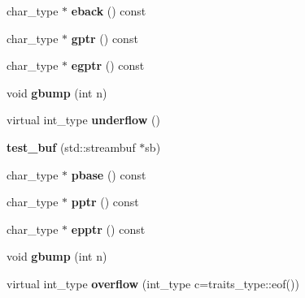 \begin{DoxyCompactItemize}
\mbox{\label{structtest__buf_a28125e70f3e3d4f7e6388feacd5a679a}} 
char\+\_\+type $\ast$ {\bfseries eback} () const
\item 
\mbox{\label{structtest__buf_a647a813e6beea56a0176dbe190a090de}} 
char\+\_\+type $\ast$ {\bfseries gptr} () const
\item 
\mbox{\label{structtest__buf_a885db87a4421d79460cc1007b45acdc4}} 
char\+\_\+type $\ast$ {\bfseries egptr} () const
\item 
\mbox{\label{structtest__buf_a4ef57230c1f973a7581e35cc19548834}} 
void {\bfseries gbump} (int n)
\item 
\mbox{\label{structtest__buf_a07968ce7dbc1007c8fb958e085ecc72f}} 
virtual int\+\_\+type {\bfseries underflow} ()
\item 
\mbox{\label{structtest__buf_ae02e6a8cae14c461432605ce343736d8}} 
{\bfseries test\+\_\+buf} (std\+::streambuf $\ast$sb)
\item 
\mbox{\label{structtest__buf_a363207f713503c9b64d2c43400022557}} 
char\+\_\+type $\ast$ {\bfseries pbase} () const
\item 
\mbox{\label{structtest__buf_a7159b30a129e98ed27b64ce0e00cf88a}} 
char\+\_\+type $\ast$ {\bfseries pptr} () const
\item 
\mbox{\label{structtest__buf_a443a700343ba98e69ac49bf9a5280944}} 
char\+\_\+type $\ast$ {\bfseries epptr} () const
\item 
\mbox{\label{structtest__buf_a4ef57230c1f973a7581e35cc19548834}} 
void {\bfseries gbump} (int n)
\item 
\mbox{\label{structtest__buf_a43d4e8d47206c5921be776e4bb566ccb}} 
virtual int\+\_\+type {\bfseries overflow} (int\+\_\+type c=traits\+\_\+type\+::eof())
\item 
\mbox{\label{structtest__buf_ae02e6a8cae14c461432605ce343736d8}} 

\end{DoxyCompactItemize}
